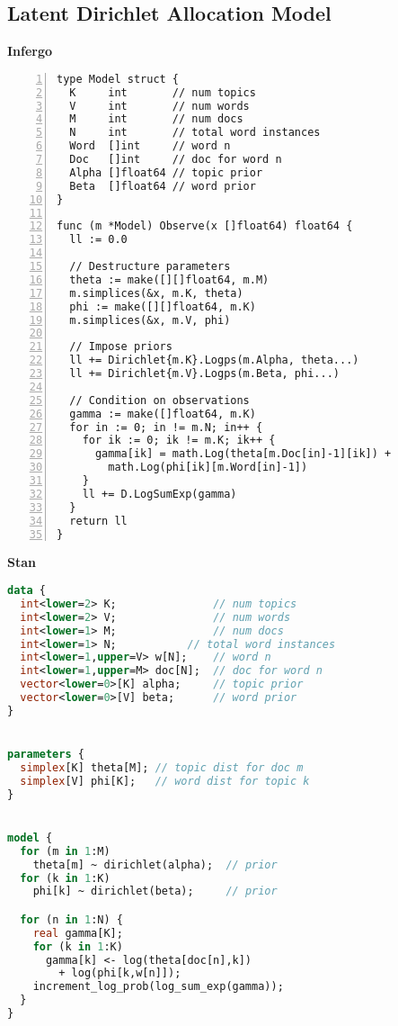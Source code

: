 \documentclass[sigplan,review,10pt,anonymous]{acmart}
\begin{document}
\begin{figure*}
\section{Latent Dirichlet Allocation Model}
	\label{app:lda}
\vspace{\baselineskip}

\begin{minipage}{0.49\textwidth}
\centering
\textbf{Infergo}

\begin{lstlisting}[framexleftmargin=10pt,numbers=left]
type Model struct {
  K     int       // num topics
  V     int       // num words
  M     int       // num docs
  N     int       // total word instances
  Word  []int     // word n
  Doc   []int     // doc for word n
  Alpha []float64 // topic prior
  Beta  []float64 // word prior
}

func (m *Model) Observe(x []float64) float64 {
  ll := 0.0

  // Destructure parameters
  theta := make([][]float64, m.M)
  m.simplices(&x, m.K, theta)
  phi := make([][]float64, m.K)
  m.simplices(&x, m.V, phi)

  // Impose priors
  ll += Dirichlet{m.K}.Logps(m.Alpha, theta...)
  ll += Dirichlet{m.V}.Logps(m.Beta, phi...)

  // Condition on observations
  gamma := make([]float64, m.K)
  for in := 0; in != m.N; in++ {
    for ik := 0; ik != m.K; ik++ {
      gamma[ik] = math.Log(theta[m.Doc[in]-1][ik]) +
        math.Log(phi[ik][m.Word[in]-1])
    }
    ll += D.LogSumExp(gamma)
  }
  return ll
}
\end{lstlisting}
\end{minipage}
\hfill
\begin{minipage}{0.49\textwidth}
	\centering
	
	\textbf{Stan}

\begin{lstlisting}[language=Stan]
data {
  int<lower=2> K;               // num topics
  int<lower=2> V;               // num words
  int<lower=1> M;               // num docs
  int<lower=1> N;           // total word instances
  int<lower=1,upper=V> w[N];    // word n
  int<lower=1,upper=M> doc[N];  // doc for word n
  vector<lower=0>[K] alpha;     // topic prior
  vector<lower=0>[V] beta;      // word prior
}


parameters {
  simplex[K] theta[M]; // topic dist for doc m
  simplex[V] phi[K];   // word dist for topic k
}


model {
  for (m in 1:M)  
    theta[m] ~ dirichlet(alpha);  // prior
  for (k in 1:K)  
    phi[k] ~ dirichlet(beta);     // prior

  for (n in 1:N) {
    real gamma[K];
    for (k in 1:K) 
      gamma[k] <- log(theta[doc[n],k]) 
	  	+ log(phi[k,w[n]]);
    increment_log_prob(log_sum_exp(gamma));
  }
}
\end{lstlisting}
	\vspace{2\baselineskip}
\end{minipage}
\end{figure*}
\end{document}
